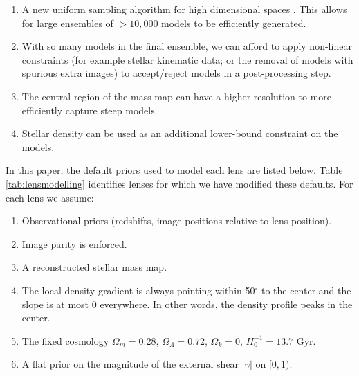 \documentclass[useAMS,usenatbib]{mn2e}
\def\Glass{{\sc Glass}}
\def\PixeLens{{\sc PixeLens}}
\begin{document}
\begin{enumerate}
\item A new uniform sampling algorithm for high
    dimensional spaces \citep{2012MNRAS.425.3077L}. This allows for large
    ensembles of $>10,000$ models to be efficiently generated. 
\item With so many models in the final ensemble, we can afford to apply
    non-linear constraints (for example stellar kinematic data; or the removal of
    models with spurious extra images) to accept/reject models in a post-processing
    step.
\item The central region of the mass map can have a higher resolution to more
    efficiently capture steep models.
\item Stellar density can be used as an additional lower-bound constraint on the models. 
\end{enumerate} 

In this paper, the default priors used to model each lens are listed below.  Table
\ref{tab:lensmodelling} identifies lenses for which we have modified these defaults.
For each lens we assume:

\begin{enumerate} 
\item Observational priors (redshifts, image positions relative to lens position).
\item Image parity is enforced.
\item A reconstructed stellar mass map.
\item The local density gradient is always pointing within 50$^{\circ}$ to the center and the slope is at most 0 everywhere. In other words, the density profile peaks in the center.
\item The fixed cosmology $\Omega_{m} = 0.28$, $\Omega_{\Lambda} = 0.72$, $\Omega_{k} = 0$, $H_{0}^{-1} = 13.7$ Gyr.
\item A flat prior on the magnitude of the external shear $|\gamma|$ on $[0,1)$.
\end{enumerate}
\end{document}
